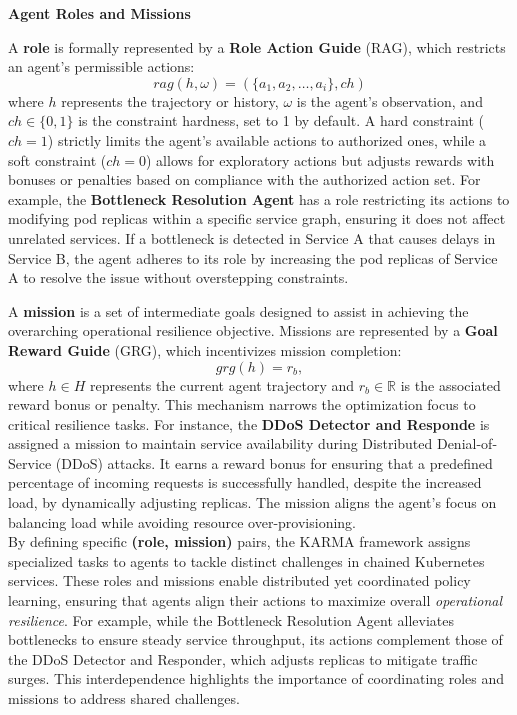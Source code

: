 \documentclass[conference]{IEEEtran}
\begin{document}
\noindent \textbf{Agent Roles and Missions}

A \textbf{role} is formally represented by a \textbf{Role Action Guide} (RAG), which restricts an agent's permissible actions:
$$
rag(h, \omega) = (\{a_1, a_2, \dots, a_i\}, ch)
$$
where $h$ represents the trajectory or history, \(\omega\) is the agent's observation, and \(ch \in \{0,1\}\) is the constraint hardness, set to 1 by default. A hard constraint (\(ch = 1\)) strictly limits the agent's available actions to authorized ones, while a soft constraint (\(ch = 0\)) allows for exploratory actions but adjusts rewards with bonuses or penalties based on compliance with the authorized action set. For example, the \textbf{Bottleneck Resolution Agent} has a role restricting its actions to modifying pod replicas within a specific service graph, ensuring it does not affect unrelated services. If a bottleneck is detected in Service A that causes delays in Service B, the agent adheres to its role by increasing the pod replicas of Service A to resolve the issue without overstepping constraints.

A \textbf{mission} is a set of intermediate goals designed to assist in achieving the overarching operational resilience objective. Missions are represented by a \textbf{Goal Reward Guide} (GRG), which incentivizes mission completion:
$$
grg(h) = r_b,
$$
where \(h \in H\) represents the current agent trajectory and \(r_b \in \mathbb{R}\) is the associated reward bonus or penalty. This mechanism narrows the optimization focus to critical resilience tasks. For instance, the \textbf{DDoS Detector and Responde} is assigned a mission to maintain service availability during Distributed Denial-of-Service (DDoS) attacks. It earns a reward bonus for ensuring that a predefined percentage of incoming requests is successfully handled, despite the increased load, by dynamically adjusting replicas. The mission aligns the agent's focus on balancing load while avoiding resource over-provisioning.\\

By defining specific \textbf{(role, mission)} pairs, the KARMA framework assigns specialized tasks to agents to tackle distinct challenges in chained Kubernetes services. These roles and missions enable distributed yet coordinated policy learning, ensuring that agents align their actions to maximize overall \textit{operational resilience}. For example, while the Bottleneck Resolution Agent alleviates bottlenecks to ensure steady service throughput, its actions complement those of the DDoS Detector and Responder, which adjusts replicas to mitigate traffic surges. This interdependence highlights the importance of coordinating roles and missions to address shared challenges.
\end{document}
